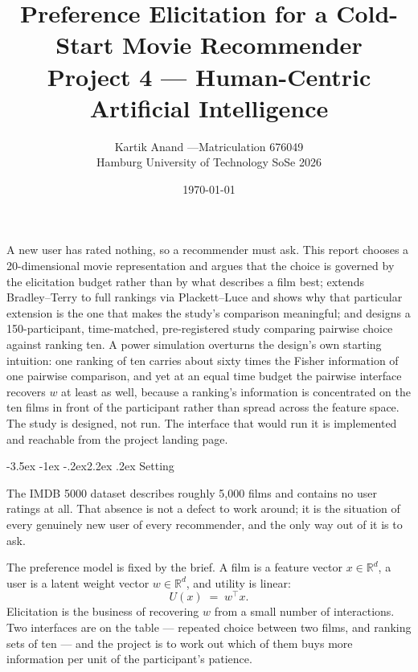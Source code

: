 \documentclass[11pt,a4paper]{article}
\title{\vspace{-1.4cm}\sffamily\color{accent}\bfseries
       Preference Elicitation for a Cold-Start Movie Recommender\\[0.25em]
       \Large\mdseries Project 4 --- Human-Centric Artificial Intelligence}
\author{Kartik Anand \quad---\quad Matriculation 676049\\[0.3em]
        \small Hamburg University of Technology \quad SoSe 2026}
\date{\small \today}
\makeatletter
\renewcommand\section{\@startsection{section}{1}{\z@}%
  {-3.5ex \@plus -1ex \@minus -.2ex}{2.2ex \@plus.2ex}%
  {\normalfont\Large\sffamily\bfseries\color{accent}}}
\newenvironment{callout}
  {\par\medskip\begin{lrbox}{\calloutbuf}%
   \begin{minipage}{\dimexpr\linewidth-24pt\relax}\setlength{\parskip}{0.4em}}
  {\end{minipage}\end{lrbox}%
   \noindent\colorbox{notebg}{\hspace{4pt}\usebox{\calloutbuf}\hspace{4pt}}\par\medskip}
\makeatother
\begin{document}
\maketitle
\thispagestyle{fancy}

\begin{callout}
A new user has rated nothing, so a recommender must ask. This report chooses a
20-dimensional movie representation and argues that the choice is governed by the
elicitation budget rather than by what describes a film best; extends
Bradley--Terry to full rankings via Plackett--Luce and shows why that particular
extension is the one that makes the study's comparison meaningful; and designs a
150-participant, time-matched, pre-registered study comparing pairwise choice
against ranking ten. A power simulation overturns the design's own starting
intuition: one ranking of ten carries about sixty times the Fisher information of
one pairwise comparison, and yet at an equal time budget the pairwise interface
recovers $w$ at least as well, because a ranking's information is concentrated on
the ten films in front of the participant rather than spread across the feature
space. The study is designed, not run. The interface that would run it is
implemented and reachable from the project landing page.
\end{callout}

\tableofcontents
\vspace{1em}

\section{Setting}

The IMDB 5000 dataset describes roughly 5{,}000 films and contains no user
ratings at all. That absence is not a defect to work around; it is the situation
of every genuinely new user of every recommender, and the only way out of it is
to ask.

The preference model is fixed by the brief. A film is a feature vector
$x \in \mathbb{R}^d$, a user is a latent weight vector $w \in \mathbb{R}^d$, and
utility is linear:
\[
  U(x) \;=\; w^{\!\top} x .
\]
Elicitation is the business of recovering $w$ from a small number of
interactions. Two interfaces are on the table --- repeated choice between two
films, and ranking sets of ten --- and the project is to work out which of them
buys more information per unit of the participant's patience.
\end{document}
